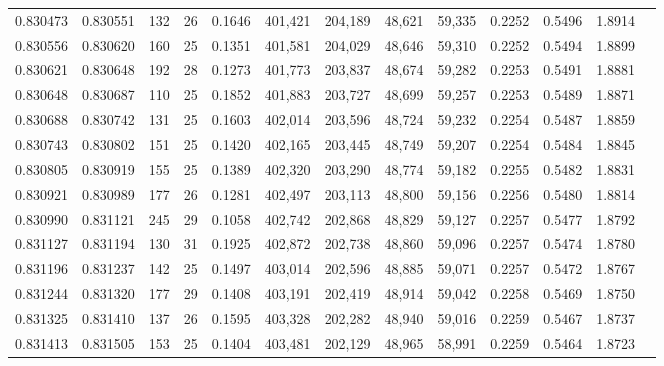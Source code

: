 \begin{tabular}{rrrrrrrrrrrrr}
0.830473 & 0.830551 &   132 &  26 &                                     0.1646 & 401,421 & 204,189 &  48,621 &  59,335 & 0.2252 & 0.5496 & 1.8914 \\
0.830556 & 0.830620 &   160 &  25 &                                     0.1351 & 401,581 & 204,029 &  48,646 &  59,310 & 0.2252 & 0.5494 & 1.8899 \\
0.830621 & 0.830648 &   192 &  28 &                                     0.1273 & 401,773 & 203,837 &  48,674 &  59,282 & 0.2253 & 0.5491 & 1.8881 \\
0.830648 & 0.830687 &   110 &  25 &                                     0.1852 & 401,883 & 203,727 &  48,699 &  59,257 & 0.2253 & 0.5489 & 1.8871 \\
0.830688 & 0.830742 &   131 &  25 &                                     0.1603 & 402,014 & 203,596 &  48,724 &  59,232 & 0.2254 & 0.5487 & 1.8859 \\
0.830743 & 0.830802 &   151 &  25 &                                     0.1420 & 402,165 & 203,445 &  48,749 &  59,207 & 0.2254 & 0.5484 & 1.8845 \\
0.830805 & 0.830919 &   155 &  25 &                                     0.1389 & 402,320 & 203,290 &  48,774 &  59,182 & 0.2255 & 0.5482 & 1.8831 \\
0.830921 & 0.830989 &   177 &  26 &                                     0.1281 & 402,497 & 203,113 &  48,800 &  59,156 & 0.2256 & 0.5480 & 1.8814 \\
0.830990 & 0.831121 &   245 &  29 &                                     0.1058 & 402,742 & 202,868 &  48,829 &  59,127 & 0.2257 & 0.5477 & 1.8792 \\
0.831127 & 0.831194 &   130 &  31 &                                     0.1925 & 402,872 & 202,738 &  48,860 &  59,096 & 0.2257 & 0.5474 & 1.8780 \\
0.831196 & 0.831237 &   142 &  25 &                                     0.1497 & 403,014 & 202,596 &  48,885 &  59,071 & 0.2257 & 0.5472 & 1.8767 \\
0.831244 & 0.831320 &   177 &  29 &                                     0.1408 & 403,191 & 202,419 &  48,914 &  59,042 & 0.2258 & 0.5469 & 1.8750 \\
0.831325 & 0.831410 &   137 &  26 &                                     0.1595 & 403,328 & 202,282 &  48,940 &  59,016 & 0.2259 & 0.5467 & 1.8737 \\
0.831413 & 0.831505 &   153 &  25 &                                     0.1404 & 403,481 & 202,129 &  48,965 &  58,991 & 0.2259 & 0.5464 & 1.8723 \\

\end{tabular}
